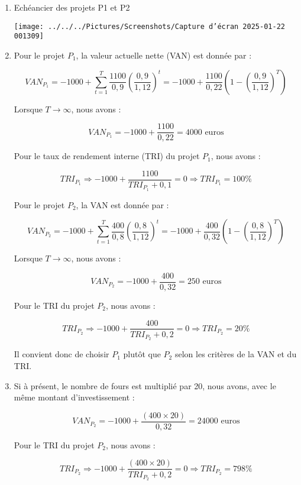 \documentclass[a4paper, 12pt]{report}
\begin{document}
\begin{enumerate}
	\item Echéancier des projets P1 et P2 
	
\begin{center}
	\texttt{[image: ../../../Pictures/Screenshots/Capture d'écran 2025-01-22 001309]}
\end{center}

\item Pour le projet \( P_1 \), la valeur actuelle nette (VAN) est donnée par :

\[
VAN_{P_1} = -1000 + \sum_{t=1}^{T} \frac{1100}{0,9} \left( \frac{0,9}{1,12} \right)^{t} = -1000 + \frac{1100}{0,22} \left( 1 - \left( \frac{0,9}{1,12} \right)^{T} \right)
\]

Lorsque \( T \to \infty \), nous avons :

\[
VAN_{P_1} = -1000 + \frac{1100}{0,22} = 4000 \text{ euros}
\]

Pour le taux de rendement interne (TRI) du projet \( P_1 \), nous avons :

\[
TRI_{P_1} \Rightarrow -1000 + \frac{1100}{TRI_{P_1} + 0,1} = 0 \Rightarrow TRI_{P_1} = 100\%
\]

Pour le projet \( P_2 \), la VAN est donnée par :

\[
VAN_{P_2} = -1000 + \sum_{t=1}^{T} \frac{400}{0,8} \left( \frac{0,8}{1,12} \right)^{t} = -1000 + \frac{400}{0,32} \left( 1 - \left( \frac{0,8}{1,12} \right)^{T} \right)
\]

Lorsque \( T \to \infty \), nous avons :

\[
VAN_{P_2} = -1000 + \frac{400}{0,32} = 250 \text{ euros}
\]

Pour le TRI du projet \( P_2 \), nous avons :

\[
TRI_{P_2} \Rightarrow -1000 + \frac{400}{TRI_{P_2} + 0,2} = 0 \Rightarrow TRI_{P_2} = 20\%
\]

Il convient donc de choisir \( P_1 \) plutôt que \( P_2 \) selon les critères de la VAN et du TRI.

\item Si à présent, le nombre de fours est multiplié par 20, nous avons, avec le même montant d’investissement :

\[
VAN_{P_2} = -1000 + \frac{(400 \times 20)}{0,32} = 24000 \text{ euros}
\]

Pour le TRI du projet \( P_2 \), nous avons :

\[
TRI_{P_2} \Rightarrow -1000 + \frac{(400 \times 20)}{TRI_{P_2} + 0,2} = 0 \Rightarrow TRI_{P_2} = 798\%
\]


\end{enumerate}
\end{document}
